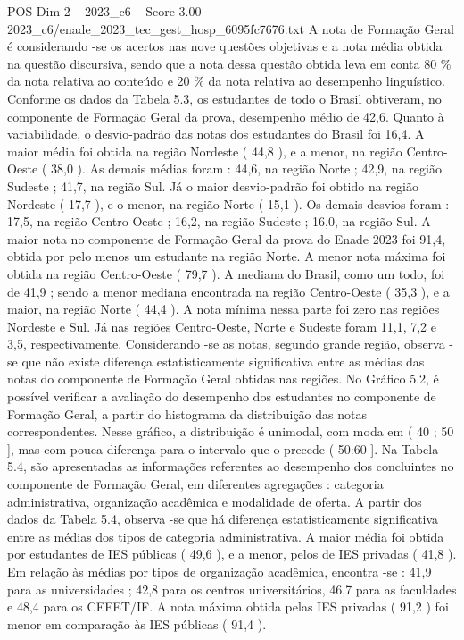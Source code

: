 \begin{textsample}{POS Dim 2 – 2023\_c6 – Score 3.00 – 2023\_c6/enade\_2023\_tec\_gest\_hosp\_6095fc7676.txt}
A nota de Formação Geral é considerando -se os acertos nas nove questões objetivas e a nota média obtida na questão discursiva, sendo que a nota dessa questão obtida leva em conta 80 \% da nota relativa ao conteúdo e 20 \% da nota relativa ao desempenho linguístico.
Conforme os dados da Tabela 5.3, os estudantes de todo o Brasil obtiveram, no componente de Formação Geral da prova, desempenho médio de 42,6.
Quanto à variabilidade, o desvio-padrão das notas dos estudantes do Brasil foi 16,4.
A maior média foi obtida na região Nordeste ( 44,8 ), e a menor, na região Centro-Oeste ( 38,0 ).
As demais médias foram : 44,6, na região Norte ; 42,9, na região Sudeste ; 41,7, na região Sul.
Já o maior desvio-padrão foi obtido na região Nordeste ( 17,7 ), e o menor, na região Norte ( 15,1 ).
Os demais desvios foram : 17,5, na região Centro-Oeste ; 16,2, na região Sudeste ; 16,0, na região Sul.
A maior nota no componente de Formação Geral da prova do Enade 2023 foi 91,4, obtida por pelo menos um estudante na região Norte.
A menor nota máxima foi obtida na região Centro-Oeste ( 79,7 ).
A mediana do Brasil, como um todo, foi de 41,9 ; sendo a menor mediana encontrada na região Centro-Oeste ( 35,3 ), e a maior, na região Norte ( 44,4 ).
A nota mínima nessa parte foi zero nas regiões Nordeste e Sul.
Já nas regiões Centro-Oeste, Norte e Sudeste foram 11,1, 7,2 e 3,5, respectivamente.
Considerando -se as notas, segundo grande região, observa -se que não existe diferença estatisticamente significativa entre as médias das notas do componente de Formação Geral obtidas nas regiões.
No Gráfico 5.2, é possível verificar a avaliação do desempenho dos estudantes no componente de Formação Geral, a partir do histograma da distribuição das notas correspondentes.
Nesse gráfico, a distribuição é unimodal, com moda em ( 40 ; 50 ], mas com pouca diferença para o intervalo que o precede ( 50:60 ].
Na Tabela 5.4, são apresentadas as informações referentes ao desempenho dos concluintes no componente de Formação Geral, em diferentes agregações : categoria administrativa, organização acadêmica e modalidade de oferta.
A partir dos dados da Tabela 5.4, observa -se que há diferença estatisticamente significativa entre as médias dos tipos de categoria administrativa.
A maior média foi obtida por estudantes de IES públicas ( 49,6 ), e a menor, pelos de IES privadas ( 41,8 ).
Em relação às médias por tipos de organização acadêmica, encontra -se : 41,9 para as universidades ; 42,8 para os centros universitários, 46,7 para as faculdades e 48,4 para os CEFET/IF.
A nota máxima obtida pelas IES privadas ( 91,2 ) foi menor em comparação às IES públicas ( 91,4 ).

\end{textsample}
